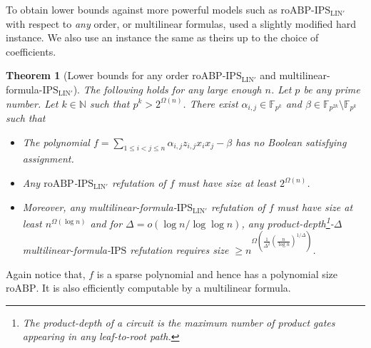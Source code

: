 \documentclass[11pt]{article}
\newtheorem{theorem}{Theorem}[section]
\newcommand{\F}{\mathbb{F}}
\renewcommand{\comment}[2]{\marginpar{\tiny{\textbf{#1: }\textit{#2}}}}
\newcommand{\nl}[1]{\comment{NL}{#1}}
\newcommand{\vr}[1]{\comment{VR}{#1}}
\newcommand{\IPS}{\mathrm{IPS}}
\newcommand{\IPSLINp}{\mathrm{IPS}_{\mathrm{LIN}'}}
\newcommand{\roABP}{\mathrm{roABP}}
\begin{document}
To obtain lower bounds against more powerful models such as $\roABP$-$\IPSLINp$ with respect to \emph{any} order, or multilinear formulas, \cite{FSTW21} used a slightly modified hard instance. We also use an instance the same as theirs up to the choice of coefficients. 

\begin{theorem}
[Lower bounds for any order roABP-$\IPSLINp$ and multilinear-formula-$\IPSLINp$]
    \label{thm:lbd-roabp}
    The following holds for any large enough $n$. Let $p$ be any prime number. Let $k \in \mathbb{N}$ such that $p^k > 2^{\Omega(n)}$. There exist $\alpha_{i,j}\in \F_{p^k}$ and $\beta \in \F_{p^{2k}}\setminus \F_{p^k}$ such that 
    \begin{itemize}
        \item The polynomial $f = \sum_{1\leq i < j\leq n}\alpha_{i,j} z_{i,j} x_i x_j - \beta$ has no Boolean satisfying assignment.
        \item Any $\roABP$-$\IPSLINp$ refutation of $f$ must have size at least $2^{\Omega(n)}$.
        \item Moreover, any multilinear-formula-$\IPSLINp$ refutation of $f$ must have size at least $n^{\Omega(\log n)}$ and for $\Delta = o(\log n / \log \log n)$, any product-depth\footnote{The product-depth of a circuit is the maximum number of product gates appearing in any leaf-to-root path.}-$\Delta$ multilinear-formula-$\IPS$ refutation requires size $\geq n^{\Omega\left(\frac{1}{\Delta^2}(\frac{n}{\log n})^{1/\Delta}\right )}$. 
    \end{itemize}
\end{theorem}

Again notice that, $f$  is a sparse polynomial and hence has a polynomial size $\roABP$. It is also efficiently computable by a multilinear formula. 
\end{document}
